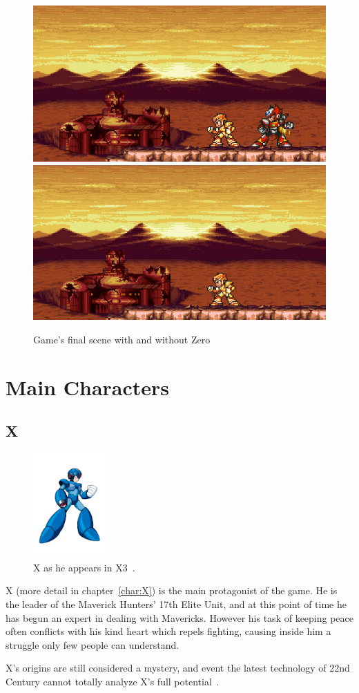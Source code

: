\begin{figure}[htp]
	\centering
	\includegraphics[width=.4\linewidth]{figures/X3/Story_3.jpg}
	\includegraphics[width=.4\linewidth]{figures/X3/Story_32.jpg}
	\caption{Game's final scene with and without Zero}
\end{figure}

\section{Main Characters}
\subsection{X}
\begin{figure}[htp]
	\centering
	\includegraphics[height=4cm]{figures/X3/X.png}
	\caption{X as he appears in X3~\cite{book:MMX_Complete_art}.}
\end{figure}
X (more detail in chapter~\ref{char:X}) is the main protagonist of the game. He is the leader of the Maverick Hunters' 17th Elite Unit, and at this point of time he has begun an expert in dealing with Mavericks. However his task of keeping peace often conflicts with his kind heart which repels fighting, causing inside him a struggle only few people can understand.

X's origins are still considered a mystery, and event the latest technology of 22nd Century cannot totally analyze X's full potential~\cite{Xcoll1:Manual_X3}.

